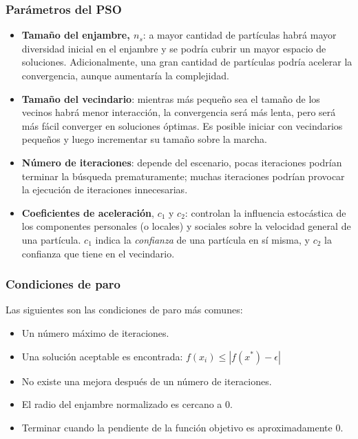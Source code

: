 \documentclass{article}
\begin{document}
\subsubsection{Parámetros del PSO}
\begin{itemize}
	\item \textbf{Tamaño del enjambre, $n_s$}: a mayor cantidad de partículas habrá mayor diversidad inicial en el enjambre y se podría cubrir un mayor espacio de soluciones.
	Adicionalmente, una gran cantidad de partículas podría acelerar la convergencia, aunque aumentaría la complejidad.
	\item \textbf{Tamaño del vecindario}: mientras más pequeño sea el tamaño de los vecinos habrá menor interacción, la convergencia será más lenta, pero será más fácil converger en soluciones óptimas.
	Es posible iniciar con vecindarios pequeños y luego incrementar su tamaño sobre la marcha.
	\item \textbf{Número de iteraciones}: depende del escenario, pocas iteraciones podrían terminar la búsqueda prematuramente; muchas iteraciones podrían provocar la ejecución de iteraciones innecesarias.
	\item \textbf{Coeficientes de aceleración}, $c_1$ y $c_2$: controlan la influencia estocástica de los componentes personales (o locales) y sociales sobre la velocidad general de una partícula. $c_1$ indica la \emph{confianza} de una partícula en sí misma, y $c_2$ la confianza que tiene en el vecindario.
\end{itemize}

\subsubsection{Condiciones de paro} 
Las siguientes son las condiciones de paro más comunes:
\begin{itemize}
	\item Un número máximo de iteraciones.
	\item Una solución aceptable es encontrada: $f(x_i) \leq |f(x^*) - \epsilon |$
	\item No existe una mejora después de un número de iteraciones.
	\item El radio del enjambre normalizado es cercano a 0.
	\item Terminar cuando la pendiente de la función objetivo es aproximadamente 0.
\end{itemize}
\end{document}
